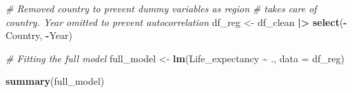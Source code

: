 \documentclass[
  10pt,
]{article}
\newenvironment{Shaded}{\begin{snugshade}}{\end{snugshade}}
\newcommand{\AttributeTok}[1]{\textcolor[rgb]{0.13,0.29,0.53}{#1}}
\newcommand{\CommentTok}[1]{\textcolor[rgb]{0.56,0.35,0.01}{\textit{#1}}}
\newcommand{\FunctionTok}[1]{\textcolor[rgb]{0.13,0.29,0.53}{\textbf{#1}}}
\newcommand{\NormalTok}[1]{#1}
\newcommand{\OtherTok}[1]{\textcolor[rgb]{0.56,0.35,0.01}{#1}}
\newcommand{\SpecialCharTok}[1]{\textcolor[rgb]{0.81,0.36,0.00}{\textbf{#1}}}
\begin{document}
\begin{Shaded}
\begin{Highlighting}[]
\CommentTok{\# Removed country to prevent dummy variables as region}
\CommentTok{\# takes care of country. Year omitted to prevent autocorrelation}
\NormalTok{df\_reg }\OtherTok{\textless{}{-}}\NormalTok{ df\_clean }\SpecialCharTok{|\textgreater{}} 
  \FunctionTok{select}\NormalTok{(}\SpecialCharTok{{-}}\NormalTok{Country, }\SpecialCharTok{{-}}\NormalTok{Year) }

\CommentTok{\# Fitting the full model}
\NormalTok{full\_model }\OtherTok{\textless{}{-}} \FunctionTok{lm}\NormalTok{(Life\_expectancy }\SpecialCharTok{\textasciitilde{}}\NormalTok{ ., }\AttributeTok{data =}\NormalTok{ df\_reg)}

\FunctionTok{summary}\NormalTok{(full\_model)}
\end{Highlighting}
\end{Shaded}
\end{document}
